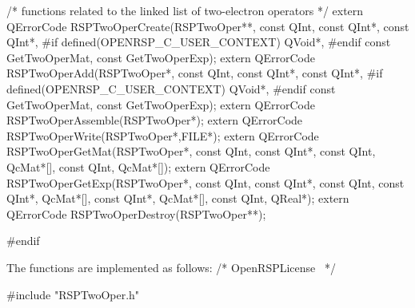 /* functions related to the linked list of two-electron operators */
extern QErrorCode RSPTwoOperCreate(RSPTwoOper**,
                                   const QInt,
                                   const QInt*,
                                   const QInt*,
#if defined(OPENRSP_C_USER_CONTEXT)
                                   QVoid*,
#endif
                                   const GetTwoOperMat,
                                   const GetTwoOperExp);
extern QErrorCode RSPTwoOperAdd(RSPTwoOper*,
                                const QInt,
                                const QInt*,
                                const QInt*,
#if defined(OPENRSP_C_USER_CONTEXT)
                                QVoid*,
#endif
                                const GetTwoOperMat,
                                const GetTwoOperExp);
extern QErrorCode RSPTwoOperAssemble(RSPTwoOper*);
extern QErrorCode RSPTwoOperWrite(RSPTwoOper*,FILE*);
extern QErrorCode RSPTwoOperGetMat(RSPTwoOper*,
                                   const QInt,
                                   const QInt*,
                                   const QInt,
                                   QcMat*[],
                                   const QInt,
                                   QcMat*[]);
extern QErrorCode RSPTwoOperGetExp(RSPTwoOper*,
                                   const QInt,
                                   const QInt*,
                                   const QInt,
                                   const QInt*,
                                   QcMat*[],
                                   const QInt*,
                                   QcMat*[],
                                   const QInt,
                                   QReal*);
extern QErrorCode RSPTwoOperDestroy(RSPTwoOper**);

#endif
\nwendcode{}\nwdocspar

The functions are implemented as follows:
\nwenddocs{}\endmoddef
/*
  \LA{}OpenRSPLicense~{\nwtagstyle{}}\RA{}
*/

#include "RSPTwoOper.h"

